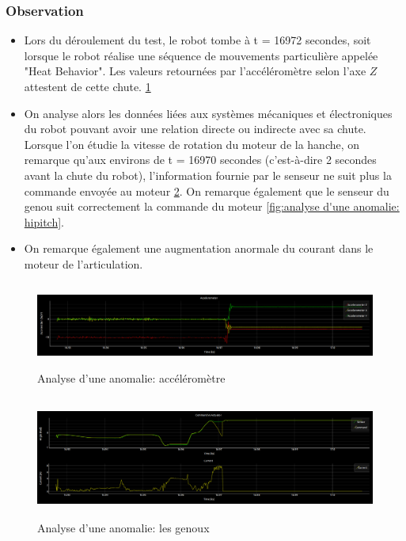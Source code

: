 \subsubsection{Observation}
\begin{itemize}
	\item Lors du déroulement du test, le robot tombe à t = 16972 secondes, soit lorsque le robot réalise une séquence de mouvements particulière appelée "Heat Behavior". Les valeurs retournées par l'accéléromètre selon l'axe $Z$ attestent de cette chute.	\ref{fig:analyse d'une anomalie: accéléromètre}
	\item On analyse alors les données liées aux systèmes mécaniques et électroniques du robot pouvant avoir une relation directe ou indirecte avec sa chute.  Lorsque l'on étudie la vitesse de rotation du moteur de la hanche, on remarque qu'aux environs de  t = 16970 secondes (c'est-à-dire 2 secondes avant la chute du robot), l'information fournie par le senseur ne suit plus la commande  envoyée au moteur \ref{fig:analyse d'une anomalie: kneePitch}. On remarque également que le senseur du genou suit correctement la commande du moteur \ref{fig:analyse d'une anomalie: hipitch}.
	\item On remarque également une augmentation anormale du courant dans le moteur de l'articulation. 
\end{itemize} 

\begin{figure}[h]
	\centering\includegraphics[height=2.8cm]{images/analyse_1.png}
	\caption{Analyse d'une anomalie: accéléromètre}
	\label{fig:analyse d'une anomalie: accéléromètre}
\end{figure}

\begin{figure}[h]
	\centering\includegraphics[height=4cm]{images/analyse_2.png}
	\caption{Analyse d'une anomalie: les genoux}
	\label{fig:analyse d'une anomalie: kneePitch}
\end{figure}

